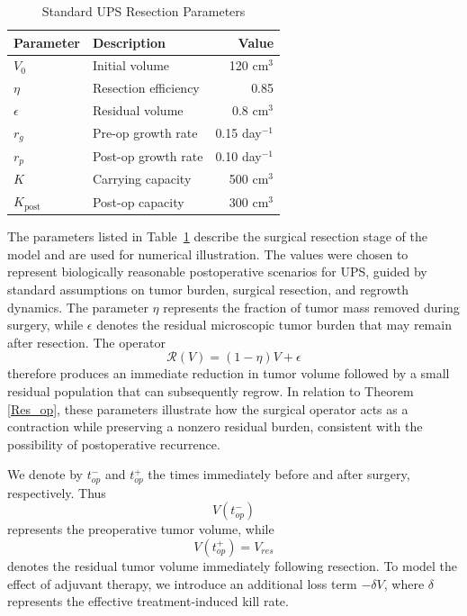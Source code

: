 \documentclass[11pt, reqno]{amsart}
\numberwithin{equation}{section}
\theoremstyle{definition}
\begin{document}
\begin{table}[h]
\centering
\caption{Standard UPS Resection Parameters}
\label{tab:resection_params}
\begin{tabular}{llr}
\toprule
Parameter & Description & Value \\
\midrule
$V_0$ & Initial volume & 120 cm$^3$ \\
$\eta$ & Resection efficiency & 0.85 \\
$\epsilon$ & Residual volume & 0.8 cm$^3$ \\
$r_g$ & Pre-op growth rate & 0.15 day$^{-1}$ \\
$r_p$ & Post-op growth rate & 0.10 day$^{-1}$ \\
$K$ & Carrying capacity & 500 cm$^3$ \\
$K_{\text{post}}$ & Post-op capacity & 300 cm$^3$ \\
\bottomrule
\end{tabular}
\end{table}

The parameters listed in Table~\ref{tab:resection_params} describe the surgical resection stage of the model and are used for numerical illustration. The values were chosen to represent biologically reasonable postoperative scenarios for UPS, guided by standard assumptions on tumor burden, surgical resection, and regrowth dynamics. The parameter $\eta$ represents the fraction of tumor mass removed during surgery, while $\epsilon$ denotes the residual microscopic tumor burden that may remain after resection. The operator
\[
\mathcal{R}(V)=(1-\eta)V+\epsilon
\]
therefore produces an immediate reduction in tumor volume followed by a small residual population that can subsequently regrow. In relation to Theorem \ref{Res_op}, these parameters illustrate how the surgical operator acts as a contraction while preserving a nonzero residual burden, consistent with the possibility of postoperative recurrence.



We denote by $t_{op}^-$ and $t_{op}^+$ the times immediately before and after surgery, respectively. Thus
\[
V(t_{op}^-)
\]
represents the preoperative tumor volume, while
\[
V(t_{op}^+)=V_{res}
\]
denotes the residual tumor volume immediately following resection. To model the effect of adjuvant therapy, we introduce an additional loss term $-\delta V$, where $\delta$ represents the effective treatment-induced kill rate.
\end{document}
